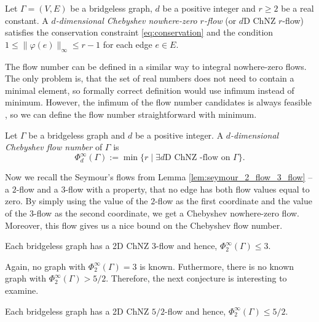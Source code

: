 \begin{definition}
    Let $\Gamma=(V, E)$ be a bridgeless graph, $d$ be a positive integer and $r\geq 2$ be a real constant. A \emph{$d$-dimensional Chebyshev nowhere-zero $r$-flow} (or $d$D ChNZ $r$-flow) satisfies the conservation constraint \eqref{eq:conservation} and the condition $1\leq\|\varphi(e)\|_\infty\leq r-1$ for each edge $e\in E$.
\end{definition}

The flow number can be defined in a similar way to integral nowhere-zero flows. The only problem is, that the set of real numbers does not need to contain a minimal element, so formally correct definition would use infimum instead of minimum. However, the infimum of the flow number candidates is always feasible \cite{TODO}, so we can define the flow number straightforward with minimum.

\begin{definition}
	Let $\Gamma$ be a bridgeless graph and $d$ be a positive integer. A \emph{$d$-dimensional Chebyshev flow number} of $\Gamma$ is
	\begin{equation*}
		\Phi_d^\infty(\Gamma) := \min\{r\mid\exists d\text{D ChNZ }\text{-flow on }\Gamma\}.
	\end{equation*}
\end{definition}

Now we recall the Seymour's flows from Lemma \ref{lem:seymour_2_flow_3_flow} -- a $2$-flow and a $3$-flow with a property, that no edge has both flow values equal to zero. By simply using the value of the $2$-flow as the first coordinate and the value of the $3$-flow as the second coordinate, we get a Chebyshev nowhere-zero flow. Moreover, this flow gives us a nice bound on the Chebyshev flow number.

\begin{proposition} \emph{\cite[p. 343]{svk}}
    Each bridgeless graph has a 2D ChNZ $3$-flow and hence, $\Phi_2^\infty(\Gamma)\leq 3$.\label{prop:chebyshev_upper_seymour}
\end{proposition}

Again, no graph with $\Phi_2^\infty(\Gamma)=3$ is known. Futhermore, there is no known graph with $\Phi_2^\infty(\Gamma)>5/2$. Therefore, the next conjecture is interesting to examine.

\begin{conjecture} \emph{\cite[p. 344]{svk}}
    Each bridgeless graph has a 2D ChNZ $5/2$-flow and hence, $\Phi_2^\infty(\Gamma)\leq 5/2$.\label{conj:chebyshev_upper_seymour}
\end{conjecture}

